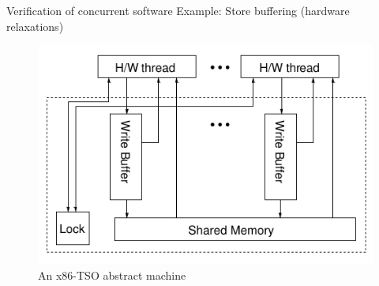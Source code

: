 \documentclass{beamer}
\begin{document}
\begin{frame}{Verification of concurrent software} {Example: Store buffering (hardware relaxations)}
\begin{center}
\end{center}

\begin{figure}
\includegraphics[scale=0.37]{img/x86-arch-full.png}
\caption{An x86-TSO abstract machine~\cite{sewell2010x86}}
\end{figure}
\end{frame}
\end{document}
